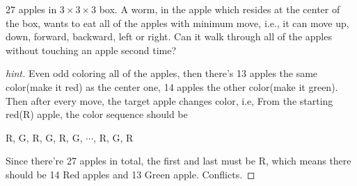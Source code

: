 \begin{example}
  27 apples in $3\times3\times3$ box. A worm, in the apple which
  resides at the center of the box, wants to eat all of the apples
  with minimum move, i.e., it can move up, down, forward, backward,
  left or right. Can it walk through all of the apples without
  touching an apple second time?
\end{example}
\begin{proof}[hint]
  Even odd coloring all of the apples, then there's 13 apples the same
  color(make it red) as the center one, 14 apples the other color(make
  it green). Then after every move, the target apple changes color,
  i.e, From the starting red(R) apple, the color sequence should be

  R, G, R, G, R, G, $\cdots$, R, G, R

  Since there're 27 apples in total, the first and last must be R,
  which means there should be 14 Red apples and 13 Green
  apple. Conflicts.


\end{proof}
